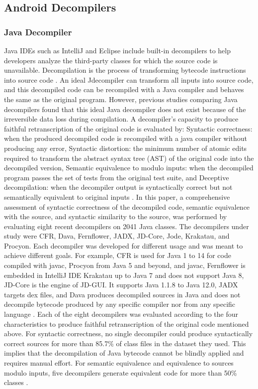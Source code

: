 \documentclass[conference,a4paper]{IEEEtran}
\begin{document}
\subsection{Android Decompilers}

\subsubsection{Java Decompiler}
Java IDEs such as IntelliJ and Eclipse include built-in decompilers to help developers analyze the third-party classes for which the source code is unavailable. Decompilation is the process of transforming bytecode instructions into source code \cite{harrand_java_2020}. An ideal Jdecompiler can transform all inputs into source code, and this decompiled code can be recompiled with a Java compiler and behaves the same as the original program. However, previous studies comparing Java decompilers found that this ideal Java decompiler does not exist because of the irreversible data loss during compilation.
A decompiler’s capacity to produce faithful retranscription of the original code is evaluated by: Syntactic correctness: when the produced decompiled code is recompiled with a java compiler without producing any error, Syntactic distortion: the minimum number of atomic edits required to transform the abstract syntax tree (AST) of the original code into the decompiled version, Semantic equivalence to modulo inputs: when the decompiled program passes the set of tests from the original test suite, and Deceptive decompilation: when the decompiler output is syntactically correct but not semantically equivalent to original inputs \cite{harrand_java_2020}.
In this paper, a comprehensive assessment of syntactic correctness of the decompiled code, semantic equivalence with the source, and syntactic similarity to the source, was performed by evaluating eight recent decompilers on 2041 Java classes. The decompilers under study were CFR, Dava, Fernflower, JADX, JD-Core, Jode, Krakatau, and Procyon. Each decompiler was developed for different usage and was meant to achieve different goals. For example, CFR is used for Java 1 to 14 for code compiled with javac, Procyon from Java 5 and beyond, and javac, Fernflower is embedded in IntelliJ IDE Krakatau up to Java 7 and does not support Java 8, JD-Core is the engine of JD-GUI. It supports Java 1.1.8 to Java 12.0, JADX targets dex files, and Dava produces decompiled sources in Java and does not decompile bytecode produced by any specific compiler nor from any specific language \cite{harrand_java_2020}.
Each of the eight decompilers was evaluated according to the four characteristics to produce faithful retranscription of the original code mentioned above. For syntactic correctness, no single decompiler could produce syntactically correct sources for more than 85.7\% of class files in the dataset they used. This implies that the decompilation of Java bytecode cannot be blindly applied and requires manual effort. For semantic equivalence and equivalence to sources modulo inputs, five decompilers generate equivalent code for more than 50\% classes \cite{harrand_java_2020}.
\end{document}
